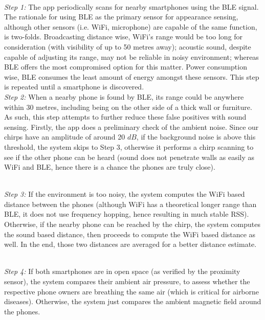 \documentclass[graybox]{svmult}
\begin{document}
\begin{description}[Type 1]
    \item[\textbf{Appearance sensing}]{\hfill \\
    \textit{Step 1:} The app periodically scans for nearby smartphones using the BLE signal. The rationale for using BLE as the primary sensor for appearance sensing, although other sensors (i.e. WiFi, microphone) are capable of the same function, is two-folds. Broadcasting distance wise, WiFi's range would be too long for consideration (with visibility of up to 50 metres away); acoustic sound, despite capable of adjusting its range, may not be reliable in noisy environment; whereas BLE offers the most compromised option for this matter. Power consumption wise, BLE consumes the least amount of energy amongst these sensors. This step is repeated until a smartphone is discovered.\\
    
    
    \textit{Step 2:} When a nearby phone is found by BLE, its range could be anywhere within 30 metres, including being on the other side of a thick wall or furniture. As such, this step attempts to further reduce these false positives with sound sensing. Firstly, the app does a preliminary check of the ambient noise. Since our chirps have an amplitude of around 20 $dB$, if the background noise is above this threshold, the system skips to Step 3, otherwise it performs a chirp scanning to see if the other phone can be heard (sound does not penetrate walls as easily as WiFi and BLE, hence there is a chance the phones are truly close).
    }
    
    \item[\textbf{Distance measuring}]{\hfill \\
    \textit{Step 3:} If the environment is too noisy, the system computes the WiFi based distance between the phones (although WiFi has a theoretical longer range than BLE, it does not use frequency hopping, hence resulting in much stable RSS). Otherwise, if the nearby phone can be reached by the chirp, the system computes the sound based distance, then proceeds to compute the WiFi based distance as well. In the end, those two distances are averaged for a better distance estimate.
    }
    
    \item[\textbf{Environment comparison}]{\hfill \\
    \textit{Step 4:} If both smartphones are in open space (as verified by the proximity sensor), the system compares their ambient air pressure, to assess whether the respective phone owners are breathing the same air (which is critical for airborne diseases). Otherwise, the system just compares the ambient magnetic field around the phones.
    }
\end{description}
\end{document}
